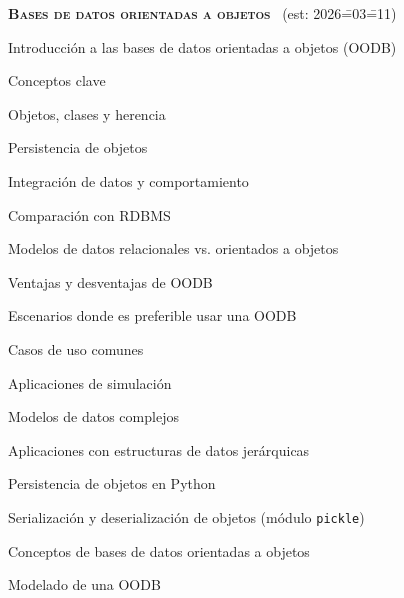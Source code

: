 \begin{longenum}
    \item \textbf{\textsc{Bases de datos orientadas a objetos}} \ (est: 2026\==03\==11)
    \begin{longenum}
        \item Introducción a las bases de datos orientadas a objetos (OODB)
        \begin{longenum}
            \item Conceptos clave
            \begin{longenum}
                \item Objetos, clases y herencia
                \item Persistencia de objetos
                \item Integración de datos y comportamiento
            \end{longenum}
            \item Comparación con RDBMS
            \begin{longenum}
                \item Modelos de datos relacionales vs. orientados a objetos
                \item Ventajas y desventajas de OODB
                \item Escenarios donde es preferible usar una OODB
            \end{longenum}
            \item Casos de uso comunes
            \begin{longenum}
                \item Aplicaciones de simulación
                \item Modelos de datos complejos
                \item Aplicaciones con estructuras de datos jerárquicas
            \end{longenum}
        \end{longenum}
        \item Persistencia de objetos en Python
        \begin{longenum}
            \item Serialización y deserialización de objetos (módulo \texttt{pickle})
        \end{longenum}
        \item Conceptos de bases de datos orientadas a objetos
        \begin{longenum}
            \item Modelado de una OODB
            \begin{longenum}

\end{longenum}
\end{longenum}
\end{longenum}
\end{longenum}
